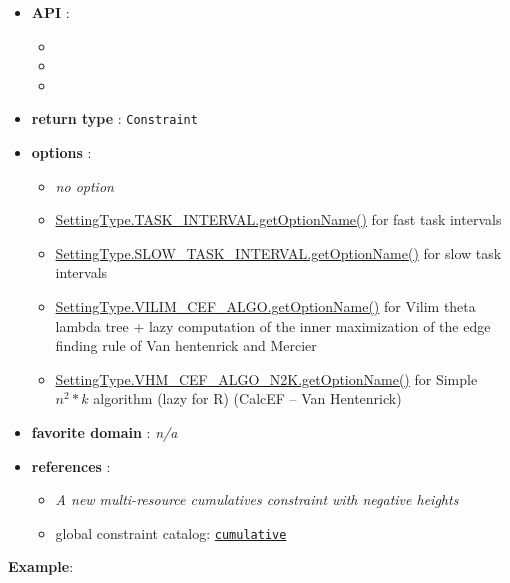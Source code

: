 \begin{itemize}
	\item \textbf{API} :
	\begin{itemize}
		\item {}
		\item {}
		\item {}
	\end{itemize}
	\item \textbf{return type} : \texttt{Constraint}
	\item \textbf{options} :
	\begin{itemize}
		\item \emph{no option}
		\item \hyperlink{ccumulativeti:ccumulativetioptions}{SettingType.TASK\_INTERVAL.getOptionName()} for fast task intervals
		\item \hyperlink{ccumulativesti:ccumulativestioptions}{SettingType.SLOW\_TASK\_INTERVAL.getOptionName()} for slow task intervals
		\item \hyperlink{ccumulativecef:ccumulativecefoptions}{SettingType.VILIM\_CEF\_ALGO.getOptionName()} for Vilim theta lambda tree + lazy computation of the inner maximization of the edge finding rule of Van hentenrick and Mercier
		\item \hyperlink{ccumulativescef:ccumulativescefoptions}{SettingType.VHM\_CEF\_ALGO\_N2K.getOptionName()} for Simple $n^2 * k$ algorithm (lazy for R) (CalcEF -- Van Hentenrick)
	\end{itemize}
	\item \textbf{favorite domain} : \emph{n/a}
	\item \textbf{references} :
      \begin{itemize}
      \item  \cite{BeldiceanuCP02} \emph{A new multi-resource cumulatives constraint with negative heights}
      \item global constraint catalog: \href{http://www.emn.fr/x-info/sdemasse/gccat/Ccumulative.html}{\tt cumulative}
      \end{itemize}
\end{itemize}

\textbf{Example}:
 
